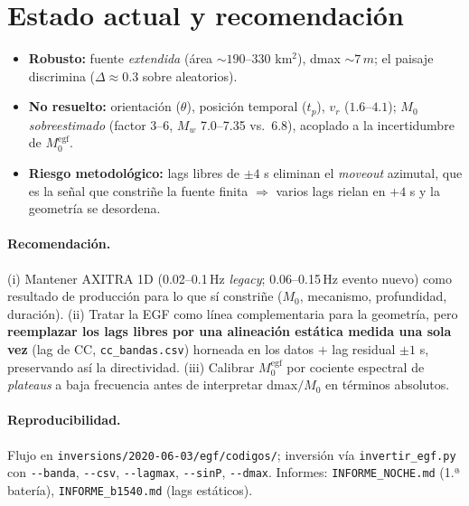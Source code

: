 \documentclass[11pt,a4paper]{article}
\newcommand{\Hz}{Hz}
\newcommand{\m}{m}
\newcommand{\SI}[2]{#1\,#2}
\newcommand{\SIrange}[3]{#1--#2\,#3}
\newcommand{\fn}[1]{\texttt{\small #1}}
\begin{document}
\section{Estado actual y recomendación}
\begin{itemize}
  \item \textbf{Robusto:} fuente \emph{extendida} (área $\sim190$--330 km$^2$),
        dmax $\sim\SI{7}{\m}$; el paisaje discrimina ($\Delta\approx0.3$ sobre
        aleatorios).
  \item \textbf{No resuelto:} orientación ($\theta$), posición temporal ($t_p$),
        $v_r$ ($1.6$--$4.1$); $M_0$ \emph{sobreestimado} (factor 3--6,
        $M_w$ 7.0--7.35 vs.\ 6.8), acoplado a la incertidumbre de
        $M_0^\text{egf}$.
  \item \textbf{Riesgo metodológico:} lags libres de $\pm4$ s eliminan el
        \emph{moveout} azimutal, que es la señal que constriñe la fuente finita
        $\Rightarrow$ varios lags rielan en $+4$ s y la geometría se
        desordena.
\end{itemize}

\paragraph{Recomendación.} (i) Mantener AXITRA 1D
(\SIrange{0.02}{0.1}{\Hz} \emph{legacy}; \SIrange{0.06}{0.15}{\Hz} evento nuevo)
como resultado de producción para lo que sí constriñe ($M_0$, mecanismo,
profundidad, duración). (ii) Tratar la EGF como línea complementaria para la
geometría, pero \textbf{reemplazar los lags libres por una alineación estática
medida una sola vez} (lag de CC, \fn{cc\_bandas.csv}) horneada en los datos $+$
lag residual $\pm1$ s, preservando así la directividad. (iii) Calibrar
$M_0^\text{egf}$ por cociente espectral de \emph{plateaus} a baja frecuencia
antes de interpretar dmax$/M_0$ en términos absolutos.

\paragraph{Reproducibilidad.} Flujo en
\fn{inversions/2020-06-03/egf/codigos/}; inversión vía
\fn{invertir\_egf.py} con \fn{-{}-banda}, \fn{-{}-csv}, \fn{-{}-lagmax},
\fn{-{}-sinP}, \fn{-{}-dmax}. Informes: \fn{INFORME\_NOCHE.md} (1.ª batería),
\fn{INFORME\_b1540.md} (lags estáticos).
\end{document}
